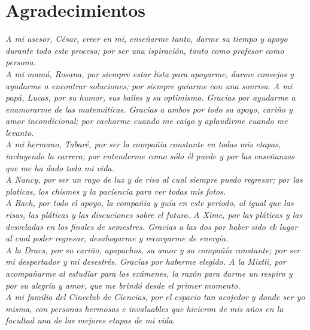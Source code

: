 \chapter*{Agradecimientos}


\textit{A mi asesor, C\'esar, creer en mi, ense\~{n}arme tanto, darme su tiempo
y apoyo durante todo este proceso; por ser una ispiraci\'on, tanto como profesor
como persona.}\\

\textit{A mi mam\'a, Rosana, por siempre estar lista para apoyarme, darme
consejos y ayudarme a encontrar soluciones;  por siempre guiarme con una
sonrisa. A mi pap\'a, Lucas,  por su humor, sus bailes y su optimismo. Gracias
por ayudarme a enamorarme de las matem\'aticas. Gracias a ambos por todo su
apoyo, cari\~{n}o y amor incondicional; por cacharme cuando me caigo y
aplaudirme cuando me levanto.}\\

\textit{A mi hermano, Tabar\'e, por ser la compa\~{n}ia constante en todas mis
etapas, incluyendo la carrera; por entenderme como s\'olo \'el puede y por las
ense\~{n}anzas que me ha dado toda mi vida.}\\

\textit{A Nancy, por ser un rayo de luz y de risa al cual siempre puedo
regresar; por las platicas, los chismes y la paciencia para ver todas mis
fotos.}\\

\textit{A Rach, por todo el apoyo, la compa\~{n}ia y gu\'ia en este periodo, al
igual que las risas, las pl\'aticas y las discuciones sobre el futuro. A Xime,
por las pl\'aticas y las desveladas en los finales de semestres. Gracias a las
dos por haber sido ek lugar al cual poder regresar, desahogarme y recargarme de
energ\'ia.} \\

\textit{A la Dracs, por su cari\~{n}o, apapachos, su amor y su compa\~{n}\'ia
constante; por ser mi despertador y mi desestr\'es. Gracias por haberme
elegido. A la Mixtli, por acompa\~{n}arme al estudiar para los ex\'amenes, la
raz\'on para darme un respiro y por su alegr\'ia y amor, que me brind\'o desde
el primer momento.}\\ 

\textit{A mi familia del Cineclub de Ciencias, por el espacio tan acojedor  y
donde ser yo misma, con personas hermosas e invaluables que hicieron de mis
a\~{n}os en la facultad una de las mejores etapas de mi vida.}\\

